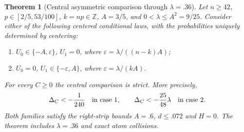 \documentclass[11pt,a4paper]{article}
\newtheorem{theorem}{Theorem}\newtheorem{lemma}[theorem]{Lemma}
\begin{document}
\begin{theorem}[Central asymmetric comparison through $\lambda=.36$]\label{thm:family}
Let $n\ge42$, $p\in[2/5,53/100]$, $k=np\in\mathbb Z$, $A=3/5$,
and $0<\lambda\le A^2=9/25$. Consider either of the following centered
conditional laws, with the probabilities uniquely determined by centering:
\begin{enumerate}
\item $U_0\in\{-A,\varepsilon\}$, $U_1=0$,
      where $\varepsilon=\lambda/((n-k)A)$;
\item $U_0=0$, $U_1\in\{-\varepsilon,A\}$,
      where $\varepsilon=\lambda/(kA)$.
\end{enumerate}
For every $C\ge0$ the central comparison is strict. More precisely,
\[
 \Delta_C<-\frac1{240}\quad\hbox{in case 1},\qquad
 \Delta_C<-\frac{25}{48}\lambda\quad\hbox{in case 2}.
\]
Both families satisfy the right-strip bounds $A=.6$, $d\le.072$ and
$H=0$. The theorem includes $\lambda=.36$ and exact atom collisions.
\end{theorem}
\end{document}

